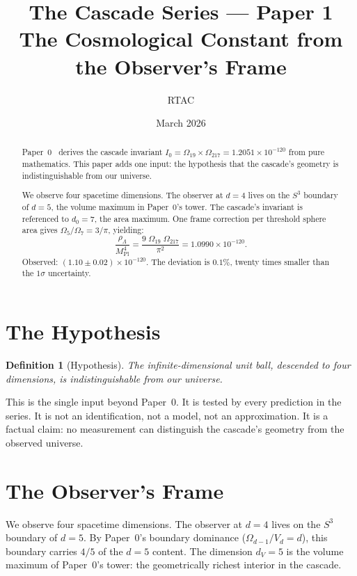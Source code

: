 \documentclass[11pt,a4paper]{article}
\title{The Cascade Series --- Paper 1\\[0.5em]
\large The Cosmological Constant from the Observer's Frame}
\author{RTAC}
\date{March 2026}
\newtheorem{definition}[theorem]{Definition}
\begin{document}
\maketitle

\begin{abstract}
Paper~0~\cite{paper0} derives the cascade invariant
$I_0 = \Omega_{19}\times\Omega_{217} = 1.2051\times 10^{-120}$ from pure
mathematics. This paper adds one input: the hypothesis that the cascade's
geometry is indistinguishable from our universe.

We observe four spacetime dimensions. The observer at $d = 4$ lives on the
$S^3$ boundary of $d = 5$, the volume maximum in Paper~0's tower. The
cascade's invariant is referenced to $d_0 = 7$, the area maximum. One
frame correction per threshold sphere area gives
$\Omega_5/\Omega_7 = 3/\pi$, yielding:
\[
\frac{\rho_\Lambda}{M^4_{\mathrm{Pl}}}
= \frac{9\;\Omega_{19}\;\Omega_{217}}{\pi^2}
= 1.0990\times 10^{-120}.
\]
Observed: $(1.10\pm 0.02)\times 10^{-120}$. The deviation is $0.1\%$,
twenty times smaller than the $1\sigma$ uncertainty.
\end{abstract}

\section{The Hypothesis}

\begin{definition}[Hypothesis]\label{def:hyp}
The infinite-dimensional unit ball, descended to four dimensions, is
indistinguishable from our universe.
\end{definition}

This is the single input beyond Paper~0. It is tested by every prediction
in the series. It is not an identification, not a model, not an
approximation. It is a factual claim: no measurement can distinguish the
cascade's geometry from the observed universe.

\section{The Observer's Frame}

We observe four spacetime dimensions. The observer at $d = 4$ lives on the
$S^3$ boundary of $d = 5$. By Paper~0's boundary dominance
($\Omega_{d-1}/V_d = d$), this boundary carries $4/5$ of the $d = 5$
content. The dimension $d_V = 5$ is the volume maximum of Paper~0's tower:
the geometrically richest interior in the cascade.
\end{document}
